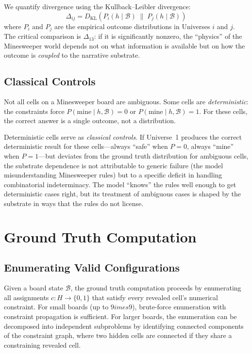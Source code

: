 \documentclass[12pt,a4paper]{article}
\begin{document}
We quantify divergence using the Kullback--Leibler divergence:
\begin{equation}
\Delta_{ij} = D_{\mathrm{KL}}\!\left(P_i(h \mid \mathcal{B}) \;\|\; P_j(h \mid \mathcal{B})\right)
\label{eq:substrate_dep}
\end{equation}
where $P_i$ and $P_j$ are the empirical outcome distributions in Universes $i$ and $j$. The critical comparison is $\Delta_{13}$: if it is significantly nonzero, the ``physics'' of the Minesweeper world depends not on what information is available but on how the outcome is \emph{coupled} to the narrative substrate.

\subsection{Classical Controls}
\label{sec:controls}

Not all cells on a Minesweeper board are ambiguous. Some cells are \emph{deterministic}: the constraints force $P(\text{mine} \mid h, \mathcal{B}) = 0$ or $P(\text{mine} \mid h, \mathcal{B}) = 1$. For these cells, the correct answer is a single outcome, not a distribution.

Deterministic cells serve as \emph{classical controls}. If Universe~1 produces the correct deterministic result for these cells---always ``safe'' when $P = 0$, always ``mine'' when $P = 1$---but deviates from the ground truth distribution for ambiguous cells, the substrate dependence is not attributable to generic failure (the model misunderstanding Minesweeper rules) but to a specific deficit in handling combinatorial indeterminacy. The model ``knows'' the rules well enough to get deterministic cases right, but its treatment of ambiguous cases is shaped by the substrate in ways that the rules do not license.

\section{Ground Truth Computation}
\label{sec:ground_truth}

\subsection{Enumerating Valid Configurations}
\label{sec:enumeration}

Given a board state $\mathcal{B}$, the ground truth computation proceeds by enumerating all assignments $c: H \to \{0,1\}$ that satisfy every revealed cell's numerical constraint. For small boards (up to $9 	imes 9$), brute-force enumeration with constraint propagation is sufficient. For larger boards, the enumeration can be decomposed into independent subproblems by identifying connected components of the constraint graph, where two hidden cells are connected if they share a constraining revealed cell.
\end{document}
